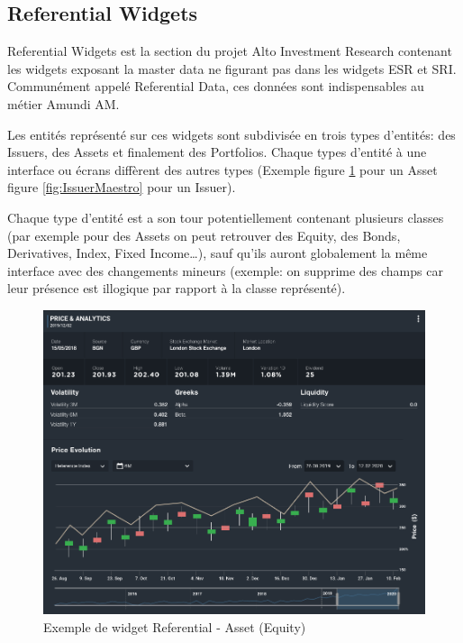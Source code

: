 \subsection{Referential Widgets}
\par Referential Widgets est la section du projet Alto Investment Research contenant les widgets exposant la master data ne figurant pas dans les widgets ESR et SRI. Communément appelé Referential Data, ces données sont indispensables au métier Amundi AM.
\par Les entités représenté sur ces widgets sont subdivisée en trois types d'entités: des Issuers, des Assets et finalement des Portfolios. Chaque types d'entité à une interface ou écrans diffèrent des autres types (Exemple figure \ref{fig:AssetInvision} pour un Asset figure \ref{fig:IssuerMaestro} pour un Issuer).
\par Chaque type d'entité est a son tour potentiellement contenant plusieurs classes (par exemple pour des Assets on peut retrouver des Equity, des Bonds, Derivatives, Index, Fixed Income\dots), sauf qu'ils auront globalement la même interface avec des changements mineurs (exemple: on supprime des champs car leur présence est illogique par rapport à la classe représenté). \\
\begin{figure}[ht]
    \centering
    \includegraphics[width=\columnwidth]{img/AssetInvision.png}
    \caption{Exemple de widget Referential - Asset (Equity)}
    \label{fig:AssetInvision}
\end{figure}
\clearpage
